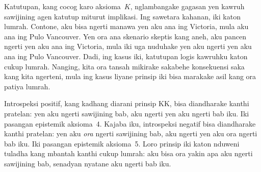 \documentclass[../../../include/open-logic-section]{subfiles}
\begin{document}
Katutupan, kang cocog karo aksioma~$K$, nglambangake gagasan yen
kawruh sawijining agen katutup miturut implikasi. Ing sawetara
kahanan, iki katon lumrah. Contone, aku bisa ngerti manawa yen aku ana
ing Victoria, mula aku ana ing Pulo Vancouver. Yen ora ana skenario skeptis
kang aneh, aku pancen ngerti yen aku ana ing Victoria, mula iki
uga nuduhake yen aku ngerti yen aku ana ing Pulo Vancouver. Dadi,
ing kasus iki, katutupan logis kawruhku katon cukup lumrah.
Nanging, kita ora tansah mikirake sakabehe konsekuensi saka kang
kita ngerteni, mula ing kasus liyane prinsip iki bisa marakake
asil kang ora patiya lumrah.

Introspeksi positif, kang kadhang diarani prinsip KK, bisa diandharake
kanthi pratelan: yen aku ngerti sawijining bab, aku ngerti yen aku
ngerti bab iku. Iki pasangan epistemik aksioma~4. Kajaba iku,
introspeksi negatif bisa diandharake kanthi pratelan: yen aku
\emph{ora} ngerti sawijining bab, aku ngerti yen aku ora ngerti
bab iku. Iki pasangan epistemik aksioma~5. Loro prinsip iki katon
nduweni tuladha kang mbantah kanthi cukup lumrah: aku bisa ora yakin
apa aku ngerti sawijining bab, senadyan nyatane aku ngerti bab iku.
\end{document}
